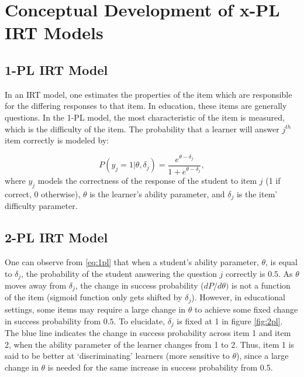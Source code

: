 \documentclass[12pt]{article}
\begin{document}
\section{Conceptual Development of x-PL IRT Models}

\subsection{1-PL IRT Model}
In an IRT model, one estimates the properties of the item which are responsible for the differing responses to that item. In education, these items are generally questions. In the 1-PL model, the most characteristic of the item is measured, which is the difficulty of the item. The probability that a learner will answer $j^{th}$ item correctly is modeled by:

\begin{equation}\label{eq:1pl}
    P(y_j=1|\theta, \delta_j) = \frac{e^{\theta - \delta_j}}{1+e^{\theta - \delta_j}},
\end{equation}
where $y_j$ models the correctness of the response of the student to item $j$ (1 if correct, 0 otherwise),  $\theta$ is the learner's ability parameter, and $\delta_j$ is the item' difficulty parameter.

\subsection{2-PL IRT Model}
One can observe from \eqref{eq:1pl} that when a student's ability parameter, $\theta$, is equal to $\delta_j$, the probability of the student answering the question $j$ correctly is $0.5$. As $\theta$ moves away from $\delta_j$, the change in success probability ($dP/ d\theta) $ is not a function of the item (sigmoid function only gets shifted by $\delta_j$). However, in educational settings, some items may require a large change in $\theta$ to achieve some fixed change in success probability from $0.5$. To elucidate, $\delta_j$ is fixed at 1 in figure \ref{fig:2pl}. The blue line indicates the change in success probability across item 1 and item 2, when the ability parameter of the learner changes from 1 to 2. Thus, item 1 is said to be better at `discriminating' learners (more sensitive to $\theta$), since a large change in $\theta$ is needed for the same increase in success probability from 0.5.
\end{document}
